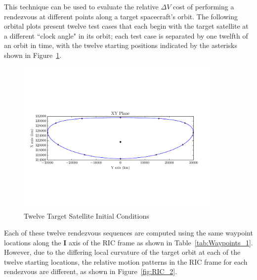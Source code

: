 \documentclass[letterpaper, preprint, paper,11pt]{AAS}	%
\begin{document}
This technique can be used to evaluate the relative \(\Delta V\) cost of performing a rendezvous at different points along a target spacecraft's orbit.  The following orbital plots present twelve test cases that each begin with the target satellite at a different ``clock angle" in its orbit; each test case is separated by one twelfth of an orbit in time, with the twelve starting positions indicated by the asterisks shown in Figure~\ref{fig:FullOrbit_2}.

\begin{figure}[htb] 
	\begin{center}
		\includegraphics[width=0.9\textwidth]{Target_Full_Orbit_2}
		\caption{Twelve Target Satellite Initial Conditions}
		\label{fig:FullOrbit_2}
	\end{center}
\end{figure}

Each of these twelve rendezvous sequences are computed using the same waypoint locations along the \(\mathbf{I}\) axis of the RIC frame as shown in Table~\ref{tab:Waypoints_1}.  However, due to the differing local curvature of the target orbit at each of the twelve starting locations, the relative motion patterns in the RIC frame for each rendezvous are different, as shown in Figure~\ref{fig:RIC_2}.  
\end{document}
